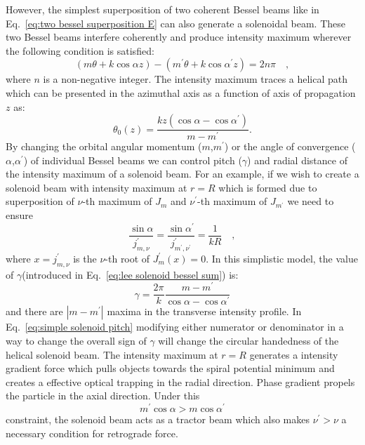 However, the simplest superposition of two coherent Bessel beams like in Eq.~\eqref{eq:two bessel superposition E} can also generate a solenoidal beam. These two Bessel beams interfere coherently and produce intensity maximum wherever the following condition is satisfied:
\begin{equation}
\label{eq:solenoid superposition bessel phase}
\left( m\theta + k\cos \alpha z \right) -\left(m^{\prime}\theta + k\cos \alpha ^{\prime} z \right) = 2n\pi \quad ,
\end{equation}
where $n$ is a non-negative integer. The intensity maximum traces a helical path which can be presented in the azimuthal axis as a function of axis of propagation $z$ as:
\begin{equation}
\label{eq:screw function}
\theta _{0}(z) = \frac{kz\left( \cos \alpha - \cos \alpha ^{\prime}\right)}{m-m^{\prime}} .
\end{equation}
By changing the orbital angular momentum ($m$,$m^{\prime}$) or the angle of convergence ($\alpha$,$\alpha ^{\prime}$) of individual Bessel beams we can control pitch ($\gamma$) and radial distance of the intensity maximum of a solenoid beam. For an example, if we wish to create a solenoid beam with intensity maximum at $r=R$ which is formed due to superposition of  $\nu$-th maximum of $J_m$ and $\nu ^{\prime}$-th maximum of $J_{m^{\prime}}$ we need to ensure
\begin{equation}
\label{eq:bessel maximum match condition}
\frac{\sin \alpha}{j^{\prime}_{m,\nu}} 
		= \frac{\sin \alpha ^{\prime}}{j^{\prime}_{m^{\prime},\nu ^{\prime}}} 
		= \frac{1}{kR} \quad ,
\end{equation}
where $x=j^{\prime}_{m,\nu}$ is the $\nu$-th root of $J^{\prime}_{m}\left( x\right)=0$. In this simplistic model, the value of $\gamma$(introduced in Eq.~\eqref{eq:lee solenoid bessel sum}) is:
\begin{equation}
\label{eq:simple solenoid pitch}
\gamma = \frac{2\pi}{k}\frac{m-m^{\prime}}{\cos \alpha - \cos \alpha ^{\prime}}
\end{equation}
and there are $|m-m^{\prime}|$ maxima in the transverse intensity profile. In Eq.~\eqref{eq:simple solenoid pitch} modifying either numerator or denominator in a way to change the overall sign of $\gamma$ will change the circular handedness of the helical solenoid beam. The intensity maximum at $r=R$ generates a intensity gradient force which pulls objects towards the spiral potential minimum and creates a effective optical trapping in the radial direction. Phase gradient propels the particle in the axial direction. Under this
\begin{equation}
\label{eq:solenoid tractor condition}
m^{\prime}\cos \alpha > m \cos \alpha ^{\prime}
\end{equation}
constraint, the solenoid beam acts as a tractor beam which also makes $\nu^{\prime} > \nu$ a necessary condition for retrograde force.






